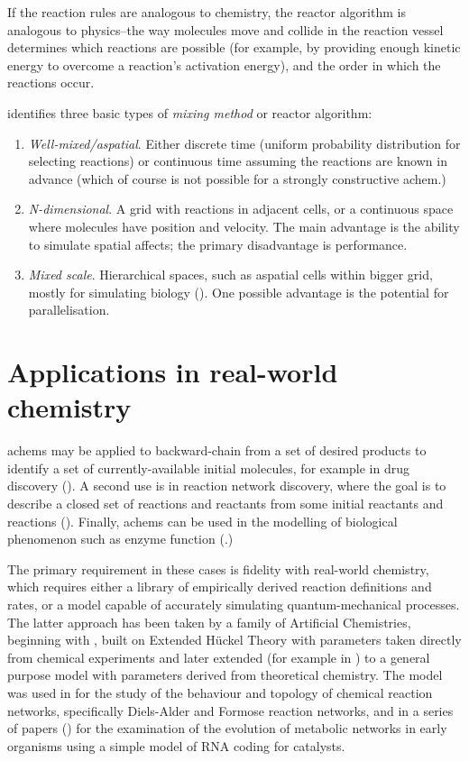 If the reaction rules are analogous to chemistry, the reactor algorithm is analogous to physics--the way molecules move and collide in the reaction vessel determines which reactions are possible (for example, by providing enough kinetic energy to overcome a reaction's activation energy), and the order in which the reactions occur.

\Textcite{Faulconbridge2011} identifies three basic types of \emph{mixing method} or reactor algorithm:
\begin{enumerate}
	\item
	\emph{Well-mixed/aspatial}. Either discrete time (uniform probability distribution for selecting reactions) or continuous time \parencite{Gillespie1976} assuming the reactions are known in advance (which of course is not possible for a strongly constructive \gls{achem}.)
	\item
	\emph{N-dimensional}. A grid with reactions in adjacent cells, or a continuous space where molecules have position and velocity. The main advantage is the ability to simulate spatial affects; the primary disadvantage is performance.
	\item
	\emph{Mixed scale}. Hierarchical spaces, such as aspatial cells within bigger grid, mostly for simulating biology (\eg \textcite{Jeschke2008}). One possible advantage is the potential for parallelisation.
\end{enumerate}

\section{Applications in real-world chemistry}\label{applications-in-real-world-chemistry}

\Glspl{achem} may be applied to backward-chain from a set of desired products to identify a set of currently-available initial molecules, for example in drug discovery (\eg \textcite{Hartenfeller2011}). A second use is in reaction network discovery, where the goal is to describe a closed set of reactions and reactants from some initial reactants and reactions (\eg \textcite{Faulon2001}). Finally, \glspl{achem} can be used in the modelling of biological phenomenon such as enzyme function (\eg \textcite{Flamm2010}.)

The primary requirement in these cases is fidelity with real-world chemistry, which requires either a library of empirically derived reaction definitions and rates, or a model capable of accurately simulating quantum-mechanical processes. The latter approach has been taken by a family of Artificial Chemistries, beginning with \textcite{Benko2003}, built on Extended H\"{u}ckel Theory with parameters taken directly from chemical experiments and later extended (for example in \textcite{Benko2005}) to a general purpose model with parameters derived from theoretical chemistry. The model was used in \textcite{Hogerl2010} for the study of the behaviour and topology of chemical reaction networks, specifically Diels-Alder and Formose reaction networks, and in a series of papers (\eg \textcite{Flamm2010,Ullrich2010}) for the examination of the evolution of metabolic networks in early organisms using a simple model of RNA coding for catalysts.

